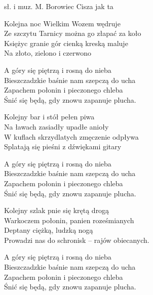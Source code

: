 {sł. i muz. M. Borowiec}
{Cisza jak ta}
\begin{text}
    \ifOneCol \else \small{ \fi
Kolejna noc Wielkim Wozem wędruje\\
Ze szczytu Tarnicy można go złapać za koło\\
Księżyc granie gór cienką kreską maluje\\
Na złoto, zielono i czerwono

\vin A góry się piętrzą i rosną do nieba\\
\vin Bieszczadzkie baśnie nam szepczą do ucha\\
\vin Zapachem połonin i pieczonego chleba\\
\vin Śnić się będą, gdy znowu zapanuje plucha.

Kolejny bar i stół pełen piwa\\
Na ławach zasiadły upadłe anioły\\
W kuflach skrzydlatych zmęczenie odpływa\\
Splatają się pieśni z dźwiękami gitary

\vin A góry się piętrzą i rosną do nieba\\
\vin Bieszczadzkie baśnie nam szepczą do ucha\\
\vin Zapachem połonin i pieczonego chleba\\
\vin Śnić się będą, gdy znowu zapanuje plucha.

\hfill\break
Kolejny szlak pnie się krętą drogą\\
Warkoczem połonin, panien roześmianych\\
Deptany ciężką, ludzką nogą\\
Prowadzi nas do schronisk – rajów obiecanych.

\vin A góry się piętrzą i rosną do nieba\\
\vin Bieszczadzkie baśnie nam szepczą do ucha\\
\vin Zapachem połonin i pieczonego chleba\\
\vin Śnić się będą, gdy znowu zapanuje plucha.
\ifOneCol \else } \fi
\end{text}
